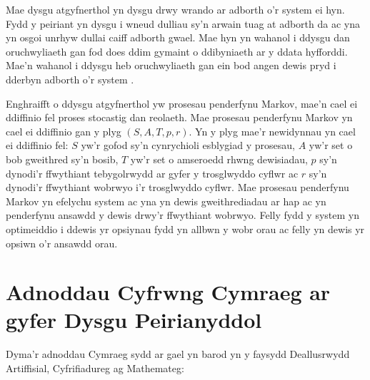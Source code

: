 Mae dysgu atgyfnerthol yn dysgu drwy wrando ar adborth o'r system ei hyn. Fydd y peiriant yn dysgu i wneud dulliau sy'n arwain tuag at adborth da ac yna yn osgoi unrhyw dullai caiff adborth gwael. Mae hyn yn wahanol i ddysgu dan oruchwyliaeth gan fod does ddim gymaint o ddibyniaeth ar y ddata hyfforddi. Mae'n wahanol i ddysgu heb oruchwyliaeth gan ein bod angen dewis pryd i dderbyn adborth o'r system \cite{technolegau-iaith}. 

Enghraifft o ddysgu atgyfnerthol yw prosesau penderfynu Markov, mae'n cael ei ddiffinio fel proses stocastig dan reolaeth. Mae prosesau penderfynu Markov yn cael ei ddiffinio gan y plyg $(S,A,T,p,r)$. Yn y plyg mae'r newidynnau yn cael ei ddiffinio fel: $S$ yw'r gofod sy'n cynrychioli esblygiad y prosesau, $A$ yw'r set o bob gweithred sy'n bosib, $T$ yw'r set o amseroedd rhwng dewisiadau, $p$ sy'n dynodi'r ffwythiant tebygolrwydd ar gyfer y trosglwyddo cyflwr ac $r$ sy'n dynodi'r ffwythiant wobrwyo i'r trosglwyddo cyflwr. Mae prosesau penderfynu Markov yn efelychu system ac yna yn dewis gweithrediadau ar hap ac yn penderfynu ansawdd y dewis drwy'r ffwythiant wobrwyo. Felly fydd y system yn optimeiddio i ddewis yr opsiynau fydd yn allbwn y wobr orau ac felly yn dewis yr opsiwn o'r ansawdd orau.\cite{PPM} 

\section{Adnoddau Cyfrwng Cymraeg ar gyfer Dysgu Peirianyddol}

Dyma'r adnoddau Cymraeg sydd ar gael yn barod yn y faysydd Deallusrwydd Artiffisial, Cyfrifiadureg ag Mathemateg:

